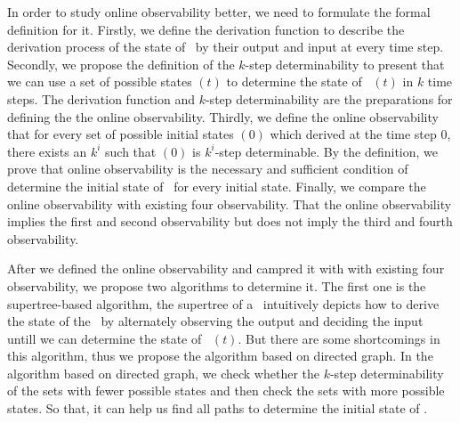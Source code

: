 In order to study online observability better, we need to formulate the formal definition for it. Firstly, we define the derivation function to describe the derivation process of the state of \BCNs\ by their output and input at every time step. Secondly, we propose the definition of the $k$-step determinability to present that we can use a set of possible states \Ustate$(t)$ to determine the state of \BCNs\ \State$(t)$ in $k$ time steps. The derivation function and $k$-step determinability are the preparations for defining the the online observability. Thirdly, we define the online observability that for every set of possible initial states \Ustate$(0)$ which derived at the time step $0$, there exists an $k^i$ such that \Ustate$(0)$ is $k^i$-step determinable. By the definition, we prove that online observability is the necessary and sufficient condition of determine the initial state of \BCNs\ for every initial state. Finally, we compare the online observability with existing four observability. That the online observability implies the first and second observability but does not imply the third and fourth observability.

After we defined the online observability and campred it with with existing four observability, we propose two algorithms to determine it. The first one is the supertree-based algorithm, the supertree of a \BCN\ intuitively depicts how to derive the state of the \BCN\ by alternately observing the output and deciding the input untill we can determine the state of \BCN\ \State$(t)$. But there are some shortcomings in this algorithm, thus we propose the algorithm based on directed graph. In the algorithm based on directed graph, we check whether the $k$-step determinability of the sets with fewer possible states and then check the sets with more possible states. So that, it can help us find all paths to determine the initial state of \BCNs.

